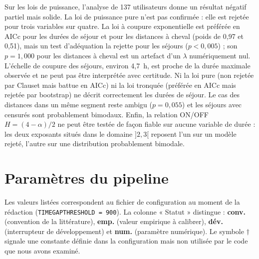 \documentclass[11pt,a4paper]{article}
\newcommand{\code}[1]{\texttt{#1}}
\renewcommand{\_}{\textunderscore\penalty0\hspace{0pt}}
\begin{document}
Sur les lois de puissance, l'analyse de 137 utilisateurs donne un résultat négatif partiel
mais solide. La loi de puissance pure n'est pas confirmée : elle est rejetée pour trois
variables sur quatre. La loi à coupure exponentielle est préférée en AICc pour les durées de
séjour et pour les distances à cheval (poids de 0,97 et 0,51), mais un test d'adéquation la
rejette pour les séjours ($p<0{,}005$) ; son $p=1{,}000$ pour les distances à cheval est un
artefact d'un $\lambda$ numériquement nul. L'échelle de coupure des séjours, environ 4,7~h,
est proche de la durée maximale observée et ne peut pas être interprétée avec certitude.
Ni la loi pure (non rejetée par Clauset mais battue en AICc) ni la loi tronquée (préférée en
AICc mais rejetée par bootstrap) ne décrit correctement les durées de séjour. Le cas des
distances dans un même segment reste ambigu ($p=0{,}055$) et les séjours avec censurés sont
probablement bimodaux. Enfin, la relation ON/OFF $H=(4-\alpha)/2$ ne peut être testée de
façon fiable sur aucune variable de durée : les deux exposants situés dans le domaine
$]2,3[$ reposent l'un sur un modèle rejeté, l'autre sur une distribution probablement
bimodale.

\appendix
\section{Paramètres du pipeline}
\label{app:params}

Les valeurs listées correspondent au fichier de configuration au moment de la rédaction
(\code{TIME\_GAP\_THRESHOLD = 900}). La colonne « Statut » distingue : \textbf{conv.}
(convention de la littérature), \textbf{emp.} (valeur empirique à calibrer), \textbf{dév.}
(interrupteur de développement) et \textbf{num.} (paramètre numérique). Le symbole $\dagger$
signale une constante définie dans la configuration mais non utilisée par le code que nous
avons examiné.
\end{document}
